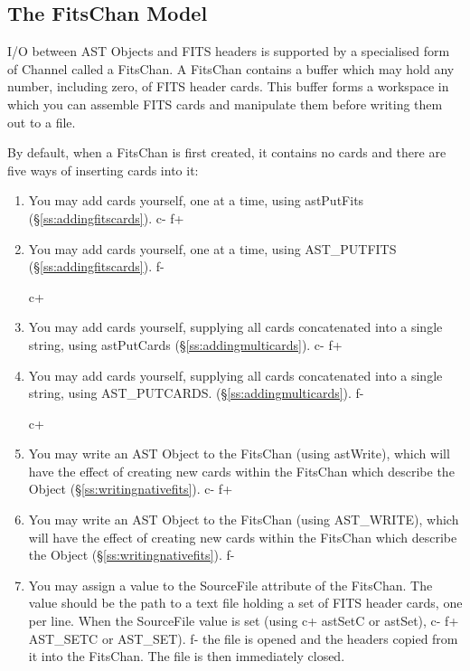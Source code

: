 \documentclass[twoside,11pt]{starlink}
\providecommand{\secref}[1]{\S\ref{#1}}
\begin{document}
{\subsection{The FitsChan Model}

I/O between AST Objects and FITS headers is supported by a specialised
form of Channel called a FitsChan. A FitsChan contains a buffer which
may hold any number, including zero, of FITS header cards. This buffer
forms a workspace in which you can assemble FITS cards and manipulate
them before writing them out to a file.

By default, when a FitsChan is first created, it contains no cards and
there are five ways of inserting cards into it:

\begin{enumerate}
c+
\item You may add cards yourself, one at a time, using astPutFits
(\secref{ss:addingfitscards}).
c-
f+
\item You may add cards yourself, one at a time, using AST\_PUTFITS
(\secref{ss:addingfitscards}).
f-

c+
\item You may add cards yourself, supplying all cards concatenated into a
single string, using astPutCards
(\secref{ss:addingmulticards}).
c-
f+
\item You may add cards yourself, supplying all cards concatenated into a
single string, using AST\_PUTCARDS.
(\secref{ss:addingmulticards}).
f-

c+
\item You may write an AST Object to the FitsChan (using astWrite),
which will have the effect of creating new cards within the FitsChan
which describe the Object (\secref{ss:writingnativefits}).
c-
f+
\item You may write an AST Object to the FitsChan (using AST\_WRITE),
which will have the effect of creating new cards within the FitsChan
which describe the Object (\secref{ss:writingnativefits}).
f-

\item You may assign a value to the SourceFile attribute of the FitsChan.
The value should be the path to a text file holding a set of FITS header
cards, one per line. When the SourceFile value is set (using
c+
astSetC or astSet),
c-
f+
AST\_SETC or AST\_SET).
f-
the file is opened and the headers copied from it into the FitsChan.
The file is then immediately closed.


\end{enumerate}}
\end{document}
